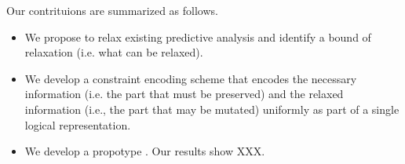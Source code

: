 Our contrituions are summarized as follows.
\begin{itemize}
\item We propose to relax existing predictive analysis and identify a bound of relaxation (i.e. what can
be relaxed).
\item We develop a constraint encoding scheme that encodes the necessary information (i.e. the
part that must be preserved) and the relaxed information (i.e., the part that may be mutated) uniformly as part of a single logical representation.
\item We develop a propotype \sysname. Our results show XXX.
\end{itemize}








